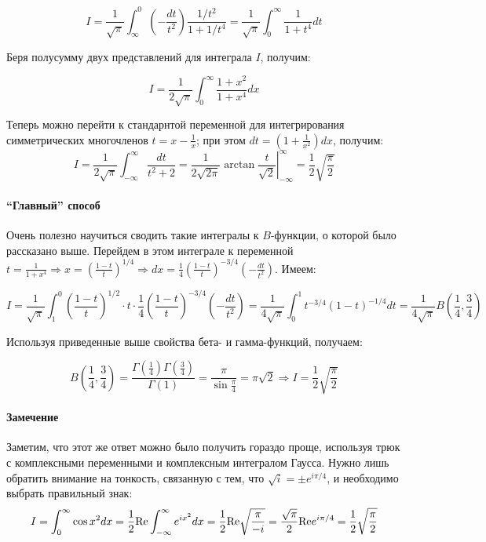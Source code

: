 \documentclass[a4paper,12pt]{article}
\begin{document}
\[
I=\frac{1}{\sqrt{\pi}}\int_{\infty}^{0}\left(-\frac{dt}{t^{2}}\right)\frac{1/t^{2}}{1+1/t^{4}}=\frac{1}{\sqrt{\pi}}\int_{0}^{\infty}\frac{1}{1+t^{4}}dt
\]

\noindent
Беря полусумму двух представлений для интеграла $I$, получим:

\[
I=\frac{1}{2\sqrt{\pi}}\int_{0}^{\infty}\frac{1+x^{2}}{1+x^{4}}dx
\]

\noindent
Теперь можно перейти к стандарнтой переменной для интегрирования симметрических
многочленов $t=x-\frac{1}{x}$; при этом $dt=\left(1+\frac{1}{x^{2}}\right)dx$,
получим:
\[
I=\frac{1}{2\sqrt{\pi}}\int_{-\infty}^{\infty}\frac{dt}{t^{2}+2}=\frac{1}{2\sqrt{2\pi}}\left.\arctan\frac{t}{\sqrt{2}}\right|_{-\infty}^{\infty}=\frac{1}{2}\sqrt{\frac{\pi}{2}}
\]



\paragraph{``Главный'' способ}

Очень полезно научиться сводить такие интегралы к $B$-функции, о
которой было рассказано выше. Перейдем в этом интеграле к переменной
$t=\frac{1}{1+x^{4}}\Rightarrow x=\left(\frac{1-t}{t}\right)^{1/4}\Rightarrow dx=\frac{1}{4}\left(\frac{1-t}{t}\right)^{-3/4}\left(-\frac{dt}{t^{2}}\right)$.
Имеем:

\[
I=\frac{1}{\sqrt{\pi}}\int_{1}^{0}\left(\frac{1-t}{t}\right)^{1/2}\cdot t\cdot\frac{1}{4}\left(\frac{1-t}{t}\right)^{-3/4}\left(-\frac{dt}{t^{2}}\right)=\frac{1}{4\sqrt{\pi}}\int_{0}^{1}t^{-3/4}(1-t)^{-1/4}dt=\frac{1}{4\sqrt{\pi}}B\left(\frac{1}{4},\frac{3}{4}\right)
\]

\noindent
Используя приведенные выше свойства бета- и гамма-функций, получаем:

\[
B\left(\frac{1}{4},\frac{3}{4}\right)=\frac{\Gamma\left(\frac{1}{4}\right)\Gamma\left(\frac{3}{4}\right)}{\Gamma(1)}=\frac{\pi}{\sin\frac{\pi}{4}}=\pi\sqrt{2}\Rightarrow I=\frac{1}{2}\sqrt{\frac{\pi}{2}}
\]



\paragraph{Замечение }

Заметим, что этот же ответ можно было получить гораздо проще, используя
трюк с комплексными переменными и комплексным интегралом Гаусса. Нужно
лишь обратить внимание на тонкость, связанную с тем, что $\sqrt{i}=\pm e^{i\pi/4}$,
и необходимо выбрать правильный знак: 
\[
I=\int_{0}^{\infty}\cos x^{2}dx=\frac{1}{2}{\rm Re}\int_{-\infty}^{\infty}e^{ix^{2}}dx=\frac{1}{2}{\rm Re}\sqrt{\frac{\pi}{-i}}=\frac{\sqrt{\pi}}{2}{\rm Re}e^{i\pi/4}=\frac{1}{2}\sqrt{\frac{\pi}{2}}
\]
\end{document}

